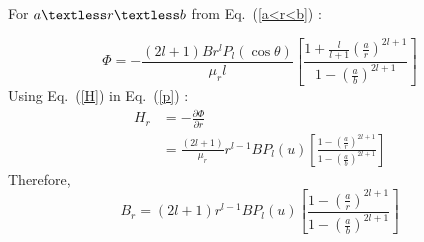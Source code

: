 For \(a\textless r\textless b \) from Eq.~(\ref{a<r<b}) :



\begin{equation}\label{p}
\Phi=-\frac{(2l+1)Br^lP_l(\cos\theta)}{\mu_r l}\left[\frac{1+\frac{l}{l+1}\left(\frac{a}{r}\right)^{2l+1}}{1-\left(\frac{a}{b}\right)^{2l+1}}\right]
\end{equation}
Using Eq.~(\ref{H}) in Eq.~(\ref{p}) :
\begin{equation}\label{Hr}
\begin{split}
    H_r &=-\frac{\partial \Phi}{\partial r}\\
      &=\frac{(2l+1)}{\mu_r}r^{l-1}BP_l(u)\left[\frac{1-\left(\frac{a}{r}\right)^{2l+1}}{1-\left(\frac{a}{b}\right)^{2l+1}}\right]
\end{split}
\end{equation}
Therefore,
\begin{equation}\label{Br}
B_r=(2l+1)r^{l-1}BP_l(u)\left[\frac{1-\left(\frac{a}{r}\right)^{2l+1}}{1-\left(\frac{a}{b}\right)^{2l+1}}\right]
\end{equation}

